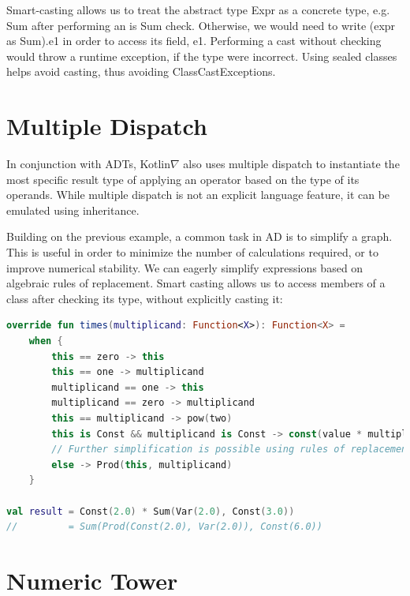 \documentclass[12pt,initial,twoside,maitrise]{dms}
\numberwithin{equation}{section}
\numberwithin{table}{chapter}
\numberwithin{figure}{chapter}
\begin{document}
Smart-casting allows us to treat the abstract type Expr as a concrete type, e.g. Sum after performing an is Sum check. Otherwise, we would need to write (expr as Sum).e1 in order to access its field, e1. Performing a cast without checking would throw a runtime exception, if the type were incorrect. Using sealed classes helps avoid casting, thus avoiding ClassCastExceptions.

\section{Multiple Dispatch}\label{sec:multiple-dispatch}

In conjunction with ADTs, Kotlin$\nabla$ also uses multiple dispatch to instantiate the most specific result type of applying an operator based on the type of its operands. While multiple dispatch is not an explicit language feature, it can be emulated using inheritance.

Building on the previous example, a common task in AD is to simplify a graph. This is useful in order to minimize the number of calculations required, or to improve numerical stability. We can eagerly simplify expressions based on algebraic rules of replacement. Smart casting allows us to access members of a class after checking its type, without explicitly casting it:

\begin{lstlisting}[caption={Multiple dispatch allows us to put all related control flow on a single abstract class which is inherited by subclasses, simplifying readability, debugging and refactoring.}, language=Kotlin]
override fun times(multiplicand: Function<X>): Function<X> =
    when {
        this == zero -> this
        this == one -> multiplicand
        multiplicand == one -> this
        multiplicand == zero -> multiplicand
        this == multiplicand -> pow(two)
        this is Const && multiplicand is Const -> const(value * multiplicand.value)
        // Further simplification is possible using rules of replacement
        else -> Prod(this, multiplicand)
    }

val result = Const(2.0) * Sum(Var(2.0), Const(3.0))
//         = Sum(Prod(Const(2.0), Var(2.0)), Const(6.0))
\end{lstlisting}

\section{Numeric Tower}\label{sec:numeric-tower}
\end{document}
